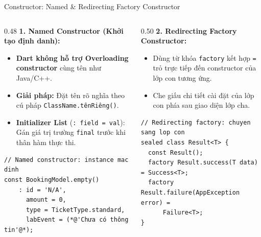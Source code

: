 \documentclass[aspectratio=169, 10pt]{beamer}
\begin{document}
\begin{frame}[fragile]{Constructor: Named \& Redirecting Factory Constructor}
\begin{columns}[c,onlytextwidth]
\begin{column}{0.48\textwidth}
\textbf{1. Named Constructor (Khởi tạo định danh):}
\begin{itemize}\setlength{\itemsep}{0.18em}
  \item \textbf{Dart không hỗ trợ Overloading constructor} cùng tên như Java/C++.
  \item \textbf{Giải pháp:} Đặt tên rõ nghĩa theo cú pháp \texttt{ClassName.tênRiêng()}.
  \item \textbf{Initializer List} (\texttt{: field = val}): Gán giá trị trường \texttt{final} trước khi thân hàm thực thi.
\end{itemize}
\vspace{0.12cm}
\begin{lstlisting}[basicstyle=\scriptsize\ttfamily, columns=flexible]
// Named constructor: instance mac dinh
const BookingModel.empty()
    : id = 'N/A',
      amount = 0,
      type = TicketType.standard,
      labEvent = (*@'Chưa có thông tin'@*);
\end{lstlisting}
\end{column}

\begin{column}{0.50\textwidth}
\textbf{2. Redirecting Factory Constructor:}
\begin{itemize}\setlength{\itemsep}{0.18em}
  \item Dùng từ khóa \texttt{factory} kết hợp \texttt{=} trỏ trực tiếp đến constructor của lớp con tương ứng.
  \item Che giấu chi tiết cài đặt của lớp con phía sau giao diện lớp cha.
\end{itemize}
\vspace{0.12cm}
\begin{lstlisting}[basicstyle=\scriptsize\ttfamily, columns=flexible]
// Redirecting factory: chuyen sang lop con
sealed class Result<T> {
  const Result();
  factory Result.success(T data) = Success<T>;
  factory Result.failure(AppException error) =
      Failure<T>;
}
\end{lstlisting}
\end{column}
\end{columns}
\end{frame}
\end{document}
